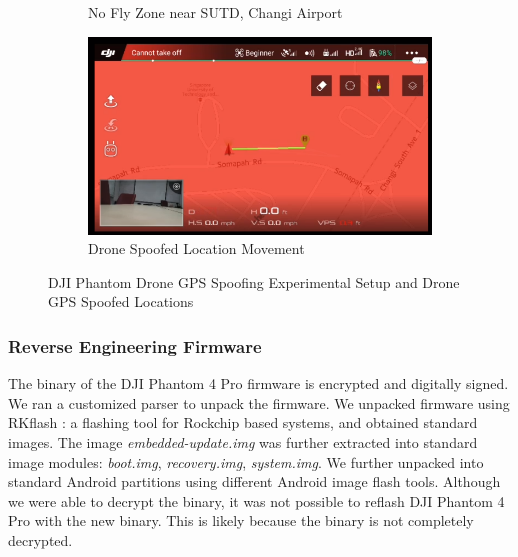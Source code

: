 \documentclass[conference]{IEEEtran}
\begin{document}
\begin{figure}[!hbt]
\begin{subfigure}{.45\textwidth}
		\caption{No Fly Zone near SUTD, Changi Airport}
		\label{fig:nfz}
	\end{subfigure} \hfil
	\begin{subfigure}{.45\textwidth}
		\centering
		\includegraphics[width=0.8\columnwidth]{moving}
		\caption{Drone Spoofed Location Movement}
		\label{fig:drone mov}
	\end{subfigure}
	
	
	\caption{DJI Phantom Drone GPS Spoofing Experimental Setup and Drone GPS Spoofed Locations }	
	\label{fig:Hist_EM}		
\end{figure}


\subsubsection{Reverse Engineering Firmware}
The binary of the DJI Phantom 4 Pro firmware is encrypted and digitally signed. 
We ran a customized parser to unpack the firmware. 
We unpacked firmware using RKflash \cite{rkflash} : a flashing tool for Rockchip based systems, and obtained standard images.
The image \emph{embedded-update.img} was further extracted into standard image modules: \emph{boot.img}, \emph{recovery.img}, \emph{system.img}.
We further unpacked into standard Android partitions using different Android image flash tools.
Although we were able to decrypt the binary, it was not possible to reflash DJI Phantom 4 Pro with the new binary.
This is likely because the binary is not completely decrypted. 
\end{document}
